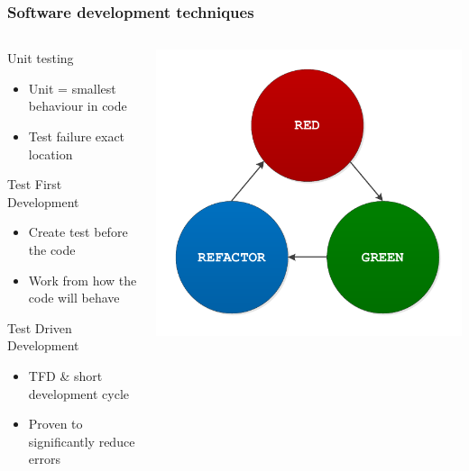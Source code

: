 \documentclass[british,10pt]{beamer}
\begin{document}
\begin{frame}\frametitle{Software development techniques}
\begin{columns}
\begin{column}{0.6\textwidth}
Unit testing
\begin{itemize}
\item Unit = smallest behaviour in code
\item Test failure  exact location
\end{itemize}
\vskip3pt
Test First Development
\begin{itemize}
\item Create test before the code
\item Work from how the code will behave
\end{itemize}
\vskip3pt
Test Driven Development
\begin{itemize}
\item TFD \& short development cycle
\item Proven to significantly reduce errors
\end{itemize}
\end{column}
\includegraphics[width=\textwidth]{images/tdd.pdf}
\end{columns}
\end{frame}
\end{document}
